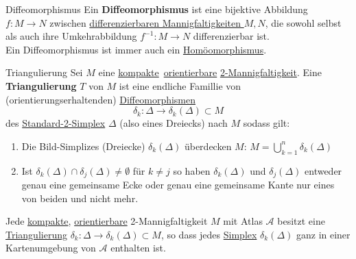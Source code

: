 \begin{titleDef}{Diffeomorphismus}
\label{diffeomorph}
Ein \textbf{Diffeomorphismus} ist eine bijektive Abbildung $f:M\to N$ zwischen \hyperref[diffMannigfaltigkeit]{differenzierbaren Mannigfaltigkeiten } $M,N$, die sowohl selbst als auch ihre Umkehrabbildung $f^{-1}:M\to N$ differenzierbar ist.\\
Ein Diffeomorphismus ist immer auch ein \hyperref[homoemorph]{Homöomorphismus}. 
\end{titleDef}

\begin{titleDef}{Triangulierung}
\label{triangulierung}
Sei $M$ eine \hyperref[kompakt]{kompakte}~\hyperref[orientierbar]{orientierbare} \hyperref[Mannigfaltigkeit]{2-Mannigfaltigkeit}. Eine \textbf{Triangulierung} $T$ von $M$ ist eine endliche Famillie von (orientierungserhaltenden) \hyperref[diffeomorph]{Diffeomorphismen}
$$\delta_k:\Delta\to\delta_k(\Delta)\subset M$$
des \hyperref[stdSimplex]{Standard-2-Simplex} $\Delta$ (also eines Dreiecks) nach $M$ sodass gilt:
\begin{enumerate}[label=(\arabic*)]
	\item Die Bild-Simplizes (Dreiecke) $\delta_k(\Delta)$ überdecken $M$: $M=\bigcup_{k=1}^n\delta_k(\Delta)$
	\item Ist $\delta_k(\Delta)\cap\delta_j(\Delta)\neq\emptyset$ für $k\neq j$ so haben $\delta_k(\Delta)$ und $\delta_j(\Delta)$ entweder genau eine gemeinsame Ecke oder genau eine gemeinsame Kante nur eines von beiden und nicht mehr.
\end{enumerate}\par
Jede \hyperref[kompakt]{kompakte}, \hyperref[orientierbar]{orientierbare} 2-Mannigfaltigkeit $M$ mit Atlas $\mathcal{A}$ besitzt eine \hyperref[triangulierung]{Triangulierung} $\delta_k:\Delta\to\delta_k(\Delta)\subset M$, so dass jedes \hyperref[simplex]{Simplex} $\delta_k(\Delta)$ ganz in einer Kartenumgebung von $\mathcal{A}$ enthalten ist.
\end{titleDef}




